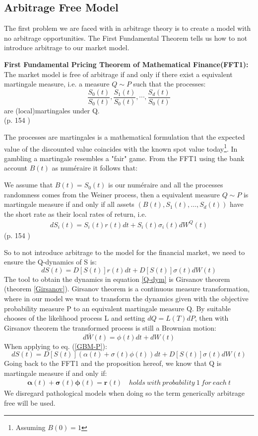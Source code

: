 \subsection{Arbitrage Free Model}
The first problem we are faced with in arbitrage theory is to create a model with no arbitrage opportunities. The First Fundamental Theorem tells us how to not introduce arbitrage to our market model.
\begin{theorem}\label{FFT1}
\textbf{First Fundamental Pricing Theorem of Mathematical Finance(FFT1): } The market model is free of arbitrage if and only if there exist a equivalent martingale measure, i.e. a measure $Q\sim P$ such that the processes:
$$\frac{S_0(t)}{S_0(t)}, \frac{S_1(t)}{S_0(t)}, \cdots, \frac{S_d(t)}{S_0(t)}$$
are (local)martingales under Q.
\\ \null \hfill (p. 154 \parencite{finKont})
\end{theorem}
The processes are martingales is a mathematical formulation that the expected value of the discounted value coincides with the known spot value today\footnote{Assuming $B(0)=1$}. In gambling a martingale resembles a "fair" game. From the FFT1 using the bank account $B(t)$ as numéraire it follows that:
\theoremstyle{proposition}
\begin{proposition}{}
We assume that $B(t)=S_0(t)$ is our numéraire and all the processes randomness comes from the Weiner process, then a equivalent measure $Q \sim P$ is martingale measure if and only if all assets $(B(t), S_1(t), \ldots, S_d(t))$ have the short rate as their local rates of return, i.e.
\begin{align*}
dS_i(t)=S_i(t)r(t)dt+S_i(t)\sigma_i(t)dW^Q(t)
\end{align*}
\null \hfill (p. 154 \parencite{finKont})
\end{proposition}
So to not introduce arbitrage to the model for the financial market, we need to ensure the Q-dynamics of S is:
\begin{equation}\label{Q-dym}
dS(t)=D[S(t)]r(t)dt+D[S(t)]\sigma(t)d{W}(t)
\end{equation}
The tool to obtain the dynamics in equation \eqref{Q-dym} is Girsanov theorem (theorem \ref{Girsanov}). Girsanov theorem is a continuous measure transformation, where in our model we want to transform the dynamics given with the objective probability measure P to an equivalent martingale measure Q. By suitable chooses of the likelihood process L and setting $dQ=L(T)dP$, then with Girsanov theorem the transformed process is still a Brownian motion:
$$d\bar{W}(t)=\phi(t)dt + dW(t)$$
When applying to eq. (\ref{GBM-P}):
$$dS(t)=D[S(t)](\alpha(t)+\sigma(t)\phi(t))dt+D[S(t)]\sigma(t)d{W}(t)$$
Going back to the FFT1 and the proposition hereof, we know that Q is martingale measure if and only if:
\begin{align}\label{marketPriceOfRisk}
\bm{\alpha}(t)+\bm{\sigma}(t)\bm{\phi}(t)=\textbf{r}(t) \quad holds \ with \ probability \ 1 \ for \ each \ t
\end{align}
We disregard pathological models when doing so the term generically arbitrage free will be used. 

